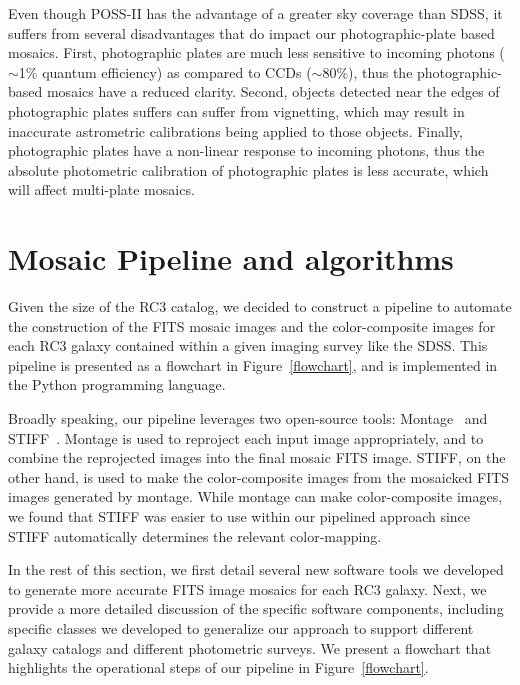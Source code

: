 \documentclass[authoryear, 12pt, 5p, times]{elsarticle}
\begin{document}
Even though POSS-II has the advantage of a greater sky coverage than SDSS, it suffers from several disadvantages that do impact our photographic-plate based mosaics. First, photographic plates are much less sensitive to incoming photons ($\sim$1\% quantum efficiency) as compared to CCDs ($\sim$80\%), thus the photographic-based mosaics have a reduced clarity. Second, objects detected near the edges of photographic plates suffers can suffer from vignetting, which may result in inaccurate astrometric calibrations being applied to those objects. Finally, photographic plates have a non-linear response to incoming photons, thus the absolute photometric calibration of photographic plates is less accurate, which will affect multi-plate mosaics.

\section{Mosaic Pipeline and algorithms\label{mosaic-sec}}
Given the size of the RC3 catalog, we decided to construct a pipeline to automate the construction of the FITS mosaic images and the color-composite images for each RC3 galaxy contained within a given imaging survey like the SDSS. This pipeline is presented as a flowchart in Figure~\ref{flowchart}, and is implemented in the Python programming language.

Broadly speaking, our pipeline leverages two open-source tools: Montage~\citep{montage} and  STIFF~\citep{stiff}. Montage is used to reproject each input image appropriately, and to combine the reprojected images into the final mosaic FITS image. STIFF, on the other hand, is used to make the color-composite images from the mosaicked FITS images generated by montage. While montage can make color-composite images, we found that STIFF was easier to use within our pipelined approach since STIFF automatically determines the relevant color-mapping.

In the rest of this section, we first detail several new software tools we developed to generate more accurate FITS image mosaics for each RC3 galaxy. Next, we provide a more detailed discussion of the specific software components, including specific classes we developed to generalize our approach to support different galaxy catalogs and different photometric surveys. We present a flowchart that highlights the operational steps of our pipeline in Figure~\ref{flowchart}.
\end{document}
